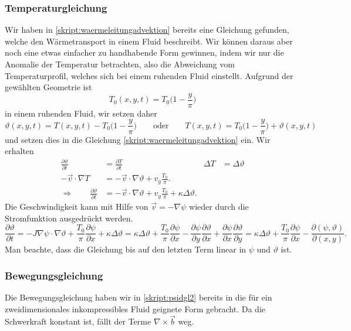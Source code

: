 \subsubsection{Temperaturgleichung}
Wir haben in \eqref{skript:waermeleitungadvektion}
bereits eine Gleichung gefunden, welche den Wärmetransport in einem 
Fluid beschreibt.
Wir können daraus aber noch eine etwas einfacher zu handhabende Form
gewinnen, indem wir nur die Anomalie der Temperatur betrachten, also
%
die Abweichung vom Temperaturprofil, welches sich bei einem ruhenden
Fluid einstellt. 
Aufgrund der gewählten Geometrie ist 
\[
T_0(x,y,t)= T_0\biggl(1- \frac{y}{\pi}\biggr)
\]
in einem ruhenden Fluid, wir setzen daher
\[
\vartheta(x,y,t)
= 
T(x,y,t)
-
T_0\biggl(1-\frac{y}{\pi}\biggr)
\qquad\text{oder}\qquad
T(x,y,t)
=
T_0\biggl(1-\frac{y}{\pi}\biggr)
+
\vartheta(x,y,t)
\]
und setzen dies in die Gleichung \eqref{skript:waermeleitungadvektion}
ein.
Wir erhalten
\begin{align*}
\frac{\partial\vartheta}{\partial t}
&=
\frac{\partial T}{\partial t}
&
\Delta T
&=
\Delta \vartheta
\\
-\vec{v}\cdot\nabla T
&=
-\vec{v}\cdot\nabla\vartheta
+v_y\frac{T_0}{\pi}.
\\
\Rightarrow
\qquad
\frac{\partial\vartheta}{\partial t}
&=
-\vec{v}\cdot\nabla \vartheta
+v_y\frac{T_0}{\pi}
+
\kappa\Delta \vartheta.
\end{align*}
Die Geschwindigkeit kann mit Hilfe von $\vec{v}=-\nabla \psi$ wieder
durch die Stromfunktion ausgedrückt werden.
\begin{equation}
\frac{\partial\vartheta}{\partial t}
=
-J\nabla\psi\cdot\nabla\vartheta
+\frac{T_0}{\pi}\frac{\partial\psi}{\partial x}
+\kappa\Delta\vartheta
=
\kappa\Delta\vartheta
+\frac{T_0}{\pi}\frac{\partial\psi}{\partial x}
-\frac{\partial \psi}{\partial y}\frac{\partial \vartheta}{\partial x}
+\frac{\partial \psi}{\partial x}\frac{\partial \vartheta}{\partial y}
=
\kappa\Delta\vartheta
+\frac{T_0}{\pi}\frac{\partial\psi}{\partial x}
-
\frac{\partial(\psi,\vartheta)}{\partial(x,y)}.
\label{skript:lorenzthetagl}
\end{equation}
Man beachte, dass die Gleichung bis auf den letzten Term linear 
in $\psi$ und $\vartheta$ ist.

\subsubsection{Bewegungsgleichung}
Die Bewegungsgleichung haben wir in
\eqref{skript:psidgl2}
bereits in die für ein zweidimensionales inkompressibles Fluid
geignete Form gebracht.
Da die Schwerkraft konstant ist, fällt der Terme $\nabla\times\vec{b}$
weg.

